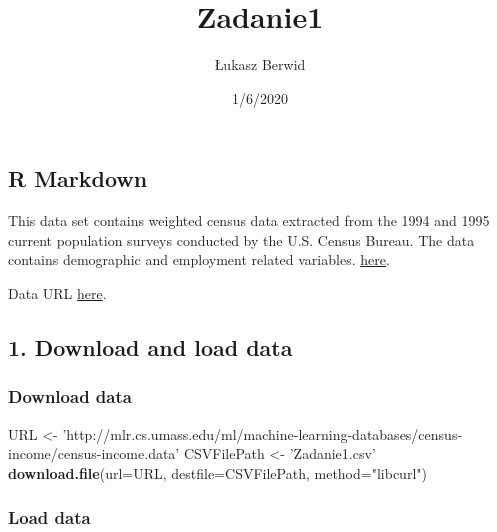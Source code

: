 \documentclass[]{article}
\title{Zadanie1}
\author{Łukasz Berwid}
\date{1/6/2020}
\newenvironment{Shaded}{\begin{snugshade}}{\end{snugshade}}
\newcommand{\DataTypeTok}[1]{\textcolor[rgb]{0.13,0.29,0.53}{#1}}
\newcommand{\KeywordTok}[1]{\textcolor[rgb]{0.13,0.29,0.53}{\textbf{#1}}}
\newcommand{\NormalTok}[1]{#1}
\newcommand{\StringTok}[1]{\textcolor[rgb]{0.31,0.60,0.02}{#1}}
\begin{document}
\maketitle

\hypertarget{r-markdown}{%
\subsection{R Markdown}\label{r-markdown}}

This data set contains weighted census data extracted from the 1994 and
1995 current population surveys conducted by the U.S. Census Bureau. The
data contains demographic and employment related variables.
\href{http://mlr.cs.umass.edu/ml/machine-learning-databases/census-income-mld/census-income.data.html}{here}.

Data URL
\href{http://mlr.cs.umass.edu/ml/machine-learning-databases/census-income/census-income.data}{here}.

\hypertarget{download-and-load-data}{%
\subsection{1. Download and load data}\label{download-and-load-data}}

\hypertarget{download-data}{%
\subsubsection{Download data}\label{download-data}}

\begin{Shaded}
\begin{Highlighting}[]
\NormalTok{ URL <-}\StringTok{ 'http://mlr.cs.umass.edu/ml/machine-learning-databases/census-income/census-income.data'}
\NormalTok{ CSVFilePath <-}\StringTok{ 'Zadanie1.csv'}
 \KeywordTok{download.file}\NormalTok{(}\DataTypeTok{url=}\NormalTok{URL, }\DataTypeTok{destfile=}\NormalTok{CSVFilePath, }\DataTypeTok{method=}\StringTok{"libcurl"}\NormalTok{)}
\end{Highlighting}
\end{Shaded}

\hypertarget{load-data}{%
\subsubsection{Load data}\label{load-data}}
\end{document}
